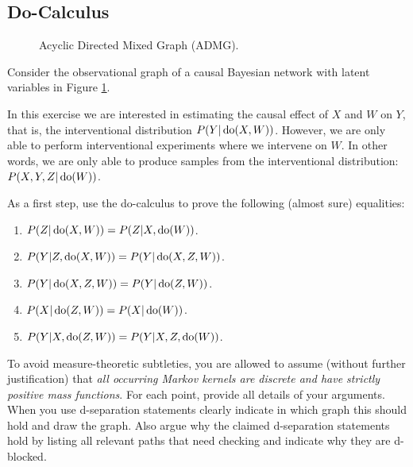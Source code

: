 \subsection{Do-Calculus}

\begin{figure}[ht]
\centering
{}
\caption{Acyclic Directed Mixed Graph (ADMG).}
\label{fig:cadmg-X}
\end{figure}

\noindent Consider the observational graph of a causal Bayesian network with latent variables in Figure \ref{fig:cadmg-X}.

In this exercise we are interested in estimating the causal effect of $X$ and $W$ on $Y$, that is, the interventional distribution $P(Y|\operatorname{do}(X,W))$. However, we are only able to perform  interventional experiments where we intervene on $W$. In other words, we are only able to produce samples from the interventional distribution: $P(X,Y,Z|\operatorname{do}(W))$.

As a first step, use the do-calculus to prove the following (almost sure) equalities:
\begin{enumerate}[label=\alph*)]
    \item $P(Z|\operatorname{do}(X,W)) = P(Z|X,\operatorname{do}(W))$. 
    \item $P(Y|Z,\operatorname{do}(X,W)) = P(Y|\operatorname{do}(X,Z,W))$.
    \item $P(Y|\operatorname{do}(X,Z,W)) = P(Y|\operatorname{do}(Z,W))$.
    \item $P(X|\operatorname{do}(Z,W)) = P(X|\operatorname{do}(W))$.
    \item $P(Y|X,\operatorname{do}(Z,W)) = P(Y|X,Z,\operatorname{do}(W))$.
\end{enumerate}
To avoid measure-theoretic subtleties, you are allowed to assume (without further justification) that \emph{all occurring Markov kernels are discrete and have strictly positive mass functions}.
For each point, provide all details of your arguments.
When you use d-separation statements clearly indicate in which graph this should hold and draw the graph. Also argue why the claimed d-separation statements hold by listing all relevant paths that need checking and indicate why they are d-blocked.

